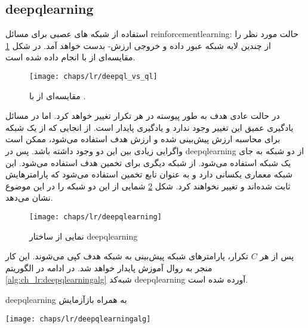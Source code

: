 \subsection{\gls{deepqlearning}}
استفاده از شبکه های عصبی برای مسائل \gls{reinforcementlearning}:
حالت مورد نظر را از چندین لایه شبکه عبور داده و خروجی ارزش- بدست خواهد آمد. در شکل \ref{fig:ch_lr:deepql_vs_ql} مقایسه‌ای از
  با 
  انجام داده شده است.
  \begin{figure}[!ht]
	\centerline{\texttt{[image: chaps/lr/deepql\_vs\_ql]}}
	\caption{مقایسه‌ای از  با .}
	\label{fig:ch_lr:deepql_vs_ql}
\end{figure} 
 در حالت عادی هدف به طور پیوسته در هر تکرار تغییر خواهد کرد. اما در مسائل یادگیری عمیق این تغییر وجود ندارد و یادگیری پایدار است. 
از انجایی که از یک شبکه برای محاسبه ارزش پیش‌بینی شده و ارزش هدف استفاده می‌شود، ممکن است واگرایی زیادی بین این دو وجود داشته باشد. پس در \gls{deepqlearning} از دو شبکه به جای یک شبکه استفاده می‌شود. از شبکه دیگری برای تخمین هدف استفاده می‌شود. این شبکه معماری یکسانی دارد و به عنوان تابع تخمین استفاده می‌شود که پارامترهایش ثابت شده‌اند و تغییر نخواهند کرد. شکل \ref{alg:ch_lr:deepqlearning} شمایی از این دو شبکه را در این موضوع نشان می‌دهد.
  \begin{figure}[!ht]
	\centerline{\texttt{[image: chaps/lr/deepqlearning]}}
	\caption{نمایی از ساختار \gls{deepqlearning}}
	\label{alg:ch_lr:deepqlearning}
\end{figure} 
 پس از هر $C$ تکرار، پارامترهای شبکه پیش‌بینی به شبکه هدف کپی می‌شوند. این کار منجر به روال آموزش پایدار خواهد شد. 
در ادامه در الگوریتم \ref{alg:ch_lr:deepqlearningalg} شبه‌کد \gls{deepqlearning} آورده شده است.
\begin{algorithm}
	\caption{\gls{deepqlearning} به همراه بازآزمایش}
	\texttt{[image: chaps/lr/deepqlearningalg]}
	\label{alg:ch_lr:deepqlearningalg}
\end{algorithm}

